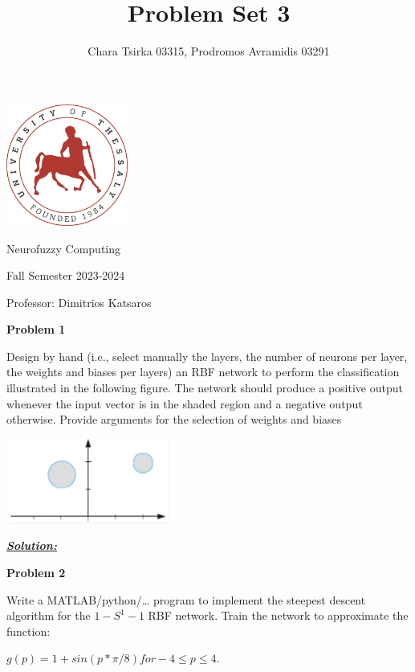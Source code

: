 \documentclass{article}
\title{\Huge Problem Set 3}
\author {\Large Chara Tsirka 03315, Prodromos Avramidis 03291}
\begin{document}
\maketitle
\begin{center}
\vspace{1cm}
\includegraphics[width=0.3\textwidth]{uthlogo.png}
\vspace{2cm}
\end{center}
\begin{center}
  \Huge Neurofuzzy Computing \vspace{1cm}

  \Large Fall Semester 2023-2024 \vspace{1cm}

  \Large Professor: Dimitrios Katsaros
\end{center}


\newpage
\noindent \textbf{Problem 1}

\noindent Design by hand (i.e., select manually the layers, the number of neurons per layer, the 
weights and biases per layers) an RBF network to perform the classification illustrated in 
the following figure. The network should produce a positive output whenever the input 
vector is in the shaded region and a negative output otherwise. Provide arguments for the 
selection of weights and biases
\begin{center}    
    \includegraphics[width=0.4\textwidth]{pr1.png}
    \vspace{2cm}
\end{center}



\noindent \underline{\textbf{\textit{Solution:}}}


\newpage
\noindent \textbf{Problem 2}

\noindent Write a MATLAB/python/… program to implement the steepest descent algorithm for the $ 1-S^1-1$ RBF network. 
Train the network to approximate the function:
\begin{center}
    $g(p) = 1 +sin(p*\pi/8) for -4 \leq p \leq 4$.    
\end{center}  
\end{document}
